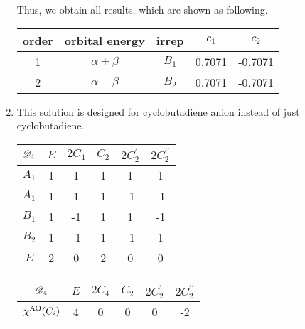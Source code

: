 \documentclass[a4paper]{book}
\newcommand{\AO}{{\rm AO}}
\begin{document}
\begin{solution}
\begin{enumerate}[label=(\alph*)]
		Thus, we obtain all results, which are shown as following.
		
		\begin{center}
		\begin{tabular}{ccccc}\hline
		order 	& orbital energy & irrep & $c_1$ & $c_2$ \\ \hline
			1	&	$\alpha+\beta$	&	$B_1$	&	0.7071	&	-0.7071	\\
			2	&	$\alpha-\beta$	&	$B_2$	&	0.7071	&	-0.7071	\\ \hline
		\end{tabular}
		\end{center}
		
		\item This solution is designed for cyclobutadiene anion instead of just cyclobutadiene.
		
		\begin{center}
		\begin{tabular}{cccccc}\hline
	$\mathscr{D}_{\rm 4}$ & $E$ & $2C_4$ &	$C_2$	& $2C^\prime_2$ & $2C^{\prime\prime}_2$ \\ \hline
			$A_1$	&	1	&	1	&	1	&	1	&	1	\\
			$A_1$	&	1	&	1	&	1	&	-1	&	-1	\\
			$B_1$	&	1	&	-1	&	1	&	1	&	-1	\\
			$B_2$	&	1	&	-1	&	1	&	-1	&	1	\\
			$E$ 	&	2	&	0	&	2	&	0	&	0\\ \hline
		\end{tabular}
		\end{center}
		
		
		\begin{center}
		\begin{tabular}{cccccc}\hline
	$\mathscr{D}_{\rm 4}$	& $E$ & $2C_4$ &	$C_2$	& $2C^\prime_2$ & $2C^{\prime\prime}_2$ \\ \hline
	$\chi^{\AO}(C_i)$	&	4	&	0	&	0	&	0	&	-2	\\ \hline
		\end{tabular}
		\end{center}
		

\end{enumerate}
\end{solution}
\end{document}
